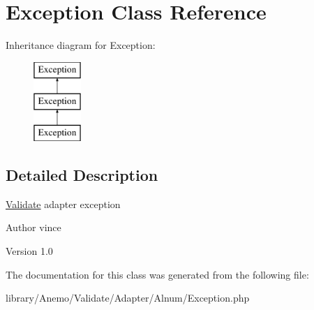 \hypertarget{class_anemo_1_1_validate_1_1_adapter_1_1_alnum_1_1_exception}{
\section{Exception Class Reference}
\label{class_anemo_1_1_validate_1_1_adapter_1_1_alnum_1_1_exception}
}
Inheritance diagram for Exception:\begin{figure}[H]
\begin{center}
\leavevmode
\includegraphics[height=3.000000cm]{class_anemo_1_1_validate_1_1_adapter_1_1_alnum_1_1_exception}
\end{center}
\end{figure}


\subsection{Detailed Description}
\hyperlink{class_anemo_1_1_validate}{Validate} adapter exception \begin{DoxyAuthor}{Author}
vince 
\end{DoxyAuthor}
\begin{DoxyVersion}{Version}
1.0 
\end{DoxyVersion}


The documentation for this class was generated from the following file:\begin{DoxyCompactItemize}
\item 
library/Anemo/Validate/Adapter/Alnum/Exception.php\end{DoxyCompactItemize}
